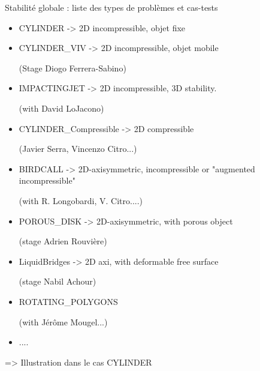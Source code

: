 \documentclass{beamer}
\begin{document}
\begin{frame}{Stabilité globale : liste des types de problèmes et cas-tests}

\scriptsize

\begin{itemize}
\item CYLINDER  		\qquad -> 2D incompressible, objet fixe

\item CYLINDER\_VIV \qquad 	-> 2D incompressible, objet mobile 

(Stage Diogo Ferrera-Sabino)

\item IMPACTINGJET  		\qquad -> 2D incompressible, 3D stability.

(with David LoJacono)

\item CYLINDER\_Compressible  \qquad -> 2D compressible 

(Javier Serra, Vincenzo Citro...)

\item BIRDCALL \qquad -> 2D-axisymmetric, incompressible or "augmented incompressible"

(with R. Longobardi, V. Citro....)


\item POROUS\_DISK \qquad -> 2D-axisymmetric, with porous object 

(stage Adrien Rouvière)

\item LiquidBridges -> 2D axi, with deformable free surface

(stage Nabil Achour)

\item ROTATING\_POLYGONS

(with Jérôme Mougel...)
\item ....

\end{itemize}

=> Illustration dans le cas CYLINDER

\end{frame}
\end{document}
